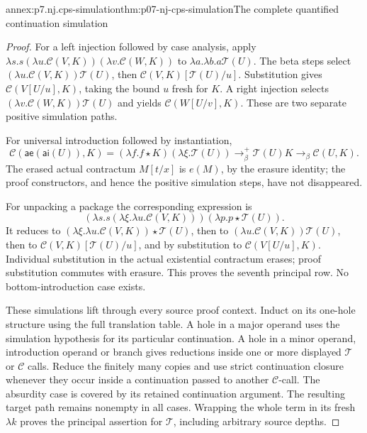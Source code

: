 \begin{annexitem}{annex:p7.nj.cps-simulation}{thm:p07-nj-cps-simulation}{The complete quantified continuation simulation}
\begin{proof}
For a left injection followed by case analysis, apply
\(\lambda s.s(\lambda u.\mathcal C(V,K))
                  (\lambda v.\mathcal C(W,K))\)
to \(\lambda a.\lambda b.a\mathcal T(U)\).
The beta steps select
\((\lambda u.\mathcal C(V,K))\mathcal T(U)\), then
\(\mathcal C(V,K)[\mathcal T(U)/u]\).
Substitution gives \(\mathcal C(V[U/u],K)\), taking the
bound \(u\) fresh for \(K\). A right injection selects
\((\lambda v.\mathcal C(W,K))\mathcal T(U)\) and yields
\(\mathcal C(W[U/v],K)\). These are two separate positive
simulation paths.

For universal introduction followed by instantiation,
\[
 \mathcal C(\mathsf{ae}(\mathsf{ai}(U)),K)
  =(\lambda f.f\star K)(\lambda\xi.\mathcal T(U))
  \to_\beta^+\mathcal T(U)K
  \to_\beta\mathcal C(U,K).
\]
The erased actual contractum \(M[t/x]\) is \(e(M)\), by
the erasure identity; the proof constructors, and hence the
positive simulation steps, have not disappeared.

For unpacking a package the corresponding expression is
\[
 (\lambda s.s(\lambda\xi.\lambda u.\mathcal C(V,K)))
       (\lambda p.p\star\mathcal T(U)).
\]
It reduces to
\((\lambda\xi.\lambda u.\mathcal C(V,K))\star\mathcal T(U)\),
then to \((\lambda u.\mathcal C(V,K))\mathcal T(U)\),
then to \(\mathcal C(V,K)[\mathcal T(U)/u]\), and by
substitution to \(\mathcal C(V[U/u],K)\). Individual
substitution in the actual existential contractum erases;
proof substitution commutes with erasure. This proves the
seventh principal row. No bottom-introduction case exists.

These simulations lift through every source proof context.
Induct on its one-hole structure using the full translation
table. A hole in a major operand uses the simulation hypothesis
for its particular continuation. A hole in a minor operand,
introduction operand or branch gives reductions inside one
or more displayed \(\mathcal T\) or \(\mathcal C\) calls.
Reduce the finitely many copies and use strict continuation
closure whenever they occur inside a continuation passed to
another \(\mathcal C\)-call. The absurdity case is covered
by its retained continuation argument. The resulting target
path remains nonempty in all cases. Wrapping the whole term
in its fresh \(\lambda k\) proves the principal assertion
for \(\mathcal T\), including arbitrary source depths.


\end{proof}
\end{annexitem}
